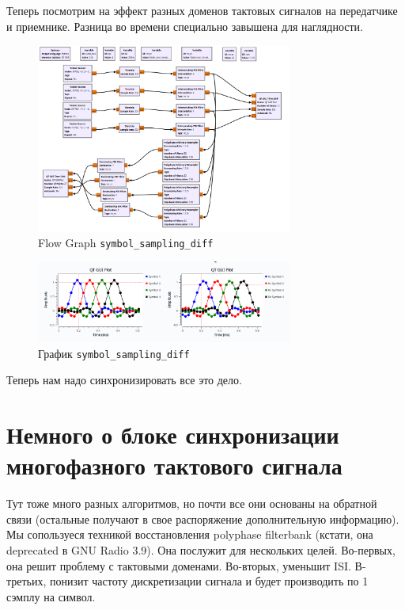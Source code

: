 \documentclass[a4paper,12pt]{report}
\begin{document}
    Теперь посмотрим на эффект разных доменов тактовых сигналов на передатчике и приемнике. Разница во времени специально завышена для наглядности.
    
    \begin{figure}[H]
        \centering
        \includegraphics[width=0.75\textwidth]{images/symbol_sampling_diff_fg.png}
        \caption{Flow Graph \texttt{symbol\_sampling\_diff}}
        \label{fig:symbol_sampling_diff_fg}
    \end{figure}
    
    \begin{figure}[H]
        \centering
        \includegraphics[width=0.75\textwidth]{images/symbol_sampling_diff_plot.png}
        \caption{График \texttt{symbol\_sampling\_diff}}
        \label{fig:symbol_sampling_diff_plot}
    \end{figure}
    
    Теперь нам надо синхронизировать все это дело.
    
    \section{Немного о блоке синхронизации многофазного тактового сигнала}
    
    Тут тоже много разных алгоритмов, но почти все они основаны на обратной связи (остальные получают в свое распоряжение дополнительную информацию). Мы сопользуеся техникой восстановления polyphase filterbank (кстати, она deprecated в GNU Radio 3.9). Она послужит для нескольких целей. Во-первых, она решит проблему с тактовыми доменами. Во-вторых, уменьшит ISI. В-третьих, понизит частоту дискретизации сигнала и будет производить по 1 сэмплу на символ.
\end{document}

